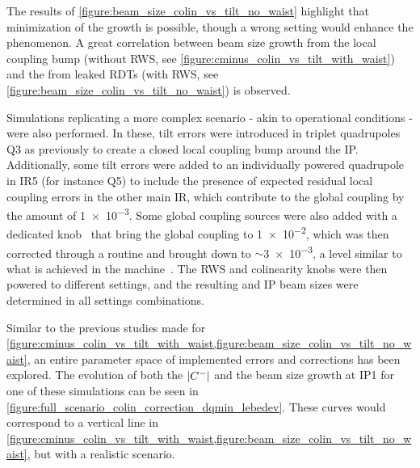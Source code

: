 The results of \cref{figure:beam_size_colin_vs_tilt_no_waist} highlight that minimization of the growth is possible, though a wrong setting would enhance the phenomenon.
A great correlation between beam size growth from the local coupling bump (without RWS, see \cref{figure:cminus_colin_vs_tilt_with_waist}) and the  from leaked RDTs (with RWS, see \cref{figure:beam_size_colin_vs_tilt_no_waist}) is observed.

Simulations replicating a more complex scenario - akin to operational conditions - were also performed.
In these, tilt errors were introduced in triplet quadrupoles Q\num{3} as previously to create a closed local coupling bump around the IP.
Additionally, some tilt errors were added to an individually powered quadrupole in IR\num{5} (for instance Q\num{5}) to include the presence of expected residual local coupling errors in the other main IR, which contribute to the global coupling by the amount of \num{1e-3}.
Some global coupling sources were also added with a dedicated knob~\cite{CERN:Tomas:Optimizing_Global_Coupling_Knobs_LHC} that bring the global coupling to \num{1e-2}, which was then corrected through a routine and brought down to \(\sim\)\num{3e-3}, a level similar to what is achieved in the machine~\cite{PRES:Persson:Transverse_Coupling_OMC_OP,PRES:Persson:Transverse_Coupling_Stability_HLLHC_WP2}.
The RWS and colinearity knobs were then powered to different settings, and the resulting  and IP beam sizes were determined in all settings combinations.

Similar to the previous studies made for \cref{figure:cminus_colin_vs_tilt_with_waist,figure:beam_size_colin_vs_tilt_no_waist}, an entire parameter space of implemented errors and corrections has been explored.
The evolution of both the \(\left\lvert C^{-} \right\rvert\) and the beam size growth at IP\num{1} for one of these simulations can be seen in \cref{figure:full_scenario_colin_correction_dqmin_lebedev}.
These curves would correspond to a vertical line in \cref{figure:cminus_colin_vs_tilt_with_waist,figure:beam_size_colin_vs_tilt_no_waist}, but with a realistic scenario.

